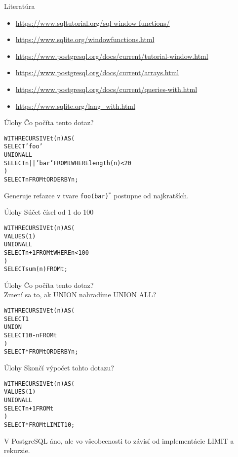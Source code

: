 \documentclass[12pt]{beamer}
\def\blue#1{\textcolor{Cerulean}{#1}}
\begin{document}
\begin{frame}{Literatúra}
\begin{itemize}
\item {\scriptsize\url{https://www.sqltutorial.org/sql-window-functions/}}
\item {\scriptsize\url{https://www.sqlite.org/windowfunctions.html}}
\item {\scriptsize\url{https://www.postgresql.org/docs/current/tutorial-window.html}}
\item {\scriptsize\url{https://www.postgresql.org/docs/current/arrays.html}}
\item {\scriptsize\url{https://www.postgresql.org/docs/current/queries-with.html}}
\item {\scriptsize\url{https://www.sqlite.org/lang_with.html}}
\end{itemize}
\end{frame}

\begin{frame}[fragile]{Úlohy}
Čo počíta tento dotaz?
\bigskip
{\small
\begin{alltt}
WITH RECURSIVE t(n) AS (
    SELECT 'foo'
  UNION ALL
    SELECT n || 'bar' FROM t WHERE length(n) < 20
)
SELECT n FROM t ORDER BY n;
\end{alltt}
}
\bigskip
\pause
Generuje reťazce v tvare \verb|foo(bar)|$^*$ postupne od najkratších.
\end{frame}


\begin{frame}[fragile]{Úlohy}
Súčet čísel od 1 do 100
\pause
\bigskip
{\small
\begin{alltt}
WITH RECURSIVE t(n) AS (
    VALUES (1)
  UNION ALL
    SELECT n+1 FROM t WHERE n < 100
)
SELECT sum(n) FROM t;
\end{alltt}
}
\end{frame}


\begin{frame}[fragile]{Úlohy}
Čo počíta tento dotaz?\\
Zmení sa to, ak UNION nahradíme UNION ALL?
\bigskip
{\small
\begin{alltt}
WITH RECURSIVE t(n) AS (
    SELECT 1
  \blue{UNION}
    SELECT 10-n FROM t
)
SELECT * FROM t ORDER BY n;
\end{alltt}
}
\end{frame}


\begin{frame}[fragile]{Úlohy}
Skončí výpočet tohto dotazu?
\bigskip
{\small
\begin{alltt}
WITH RECURSIVE t(n) AS (
    VALUES (1)
  UNION ALL
    SELECT n+1 FROM t
)
SELECT * FROM t LIMIT 10;
\end{alltt}
}
\bigskip
\pause
V PostgreSQL áno, ale vo všeobecnosti to závisí od implementácie LIMIT a rekurzie.
\end{frame}
\end{document}

